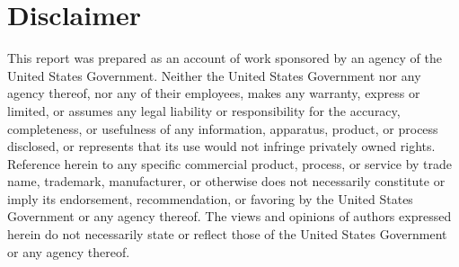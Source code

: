 \documentclass[preprint,12pt]{elsarticle}
\begin{document}
\section*{Disclaimer}
\label{sec:disc}

This report was prepared as an account of work sponsored by an agency of the United States Government. Neither the United States Government nor any agency thereof, nor any of their employees, makes any warranty, express or limited, or assumes any legal liability or responsibility for the accuracy, completeness, or usefulness of any information, apparatus, product, or process disclosed, or represents that its use would not infringe privately owned rights. Reference herein to any specific commercial product, process, or service by trade name, trademark, manufacturer, or otherwise does not necessarily constitute or imply its endorsement, recommendation, or favoring by the United States Government or any agency thereof. The views and opinions of authors expressed herein do not necessarily state or reflect those of the United States Government or any agency thereof.



\end{document}
